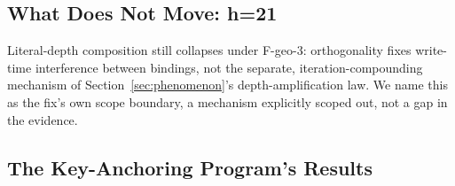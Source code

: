 \subsection{What Does Not Move: h=21}

Literal-depth composition still collapses under F-geo-3: orthogonality
fixes write-time interference between bindings, not the separate,
iteration-compounding mechanism of Section~\ref{sec:phenomenon}'s
depth-amplification law. We name this as the fix's own scope boundary, a
mechanism explicitly scoped out, not a gap in the evidence.

\subsection{The Key-Anchoring Program's Results}

